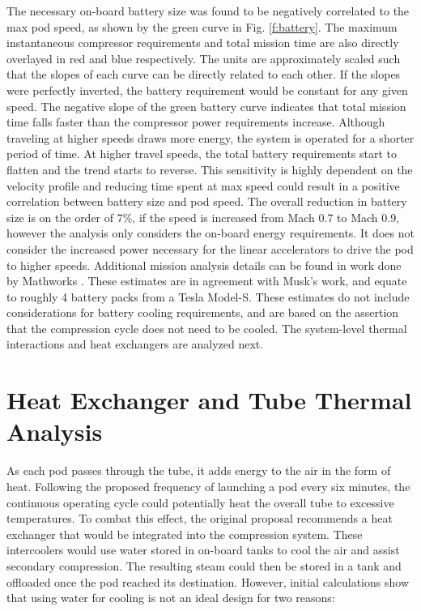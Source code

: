 \documentclass[heading.tex]{subfiles}
\begin{document}
The necessary on-board battery size was found to be negatively correlated to the max pod speed, as shown by the green curve in Fig. \ref{f:battery}.
The maximum instantaneous compressor requirements and total mission time
are also directly overlayed in red and blue respectively. 
The units are approximately scaled such that the slopes of each curve can be directly related to each other.
If the slopes were perfectly inverted, the battery requirement would be constant for any given speed.
The negative slope of the green battery curve indicates that total mission time falls faster than the compressor power requirements increase.
Although traveling at higher speeds draws more energy, the system is operated for a shorter period of time.
At higher travel speeds, the total battery requirements start to flatten and the trend starts to reverse.
This sensitivity is highly dependent on the velocity profile
and reducing time spent at max speed could result in a positive correlation between battery size and pod speed.
The overall reduction in battery size is on the order of 7\%, if the speed is increased from Mach 0.7 to Mach 0.9, 
however the analysis only considers the on-board energy requirements. It does not consider the increased power
necessary for the linear accelerators to drive the pod to higher speeds. 
Additional mission analysis details can be found in work done by Mathworks \cite{Rouleau}.
These estimates are in agreement with Musk's work, and equate to roughly 4 battery packs from a Tesla Model-S.
These estimates do not include considerations for battery cooling requirements,
and are based on the assertion that the compression cycle does not need to be cooled.
The system-level thermal interactions and heat exchangers are analyzed next.

\section{Heat Exchanger and Tube Thermal Analysis}
\label{s:heatex}
As each pod passes through the tube, it adds energy to the air in the form of heat.
Following the proposed frequency of launching a pod every six minutes,
the continuous operating cycle could potentially heat the overall tube to excessive temperatures.
To combat this effect, the original proposal recommends a heat exchanger that would be integrated into the compression system.
These intercoolers would use water stored in on-board tanks to cool the air and assist secondary compression.
The resulting steam could then be stored in a tank and offloaded once the pod reached its destination.
However, initial calculations show that using water for cooling is not an ideal design for two reasons:
\end{document}
